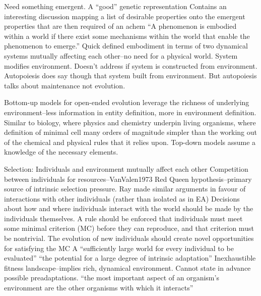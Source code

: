 Need something emergent. \parencite{Nellis2014}
A ``good'' genetic representation \parencite{Soros2014}
Contains an interesting discussion mapping a list of desirable properties onto the emergent properties that are then required of an \gls{achem} \parencite{Faulconbridge2010, Faulconbridge2011}
``A phenomenon is embodied within a world if there exist some mechanisms within the world that enable the phenomenon to emerge.'' \cite{Nellis2014}
Quick defined embodiment in terms of two dynamical systems mutually affecting each other--no need for a physical world. System modifies environment. Doesn't address if system is constructed from environment. Autopoiesis does say though that system built from environment. But autopoiesis talks about maintenance not evolution. \parencite{Nellis2014}

Bottom-up models for open-ended evolution leverage the richness of underlying environment--less information in entity definition, more in environment definition. Similar to biology, where physics and chemistry underpin living organisms, where definition of minimal cell many orders of magnitude simpler than the working out of the chemical and physical rules that it relies upon. Top-down models assume a knowledge of the necessary elements.

Selection:
Individuals and environment mutually affect each other \parencite{Taylor2001}
Competition between individuals for resources--VanValen1973 Red Queen hypothesis--primary source of intrinsic selection pressure. \parencite{Taylor2001}
Ray made similar arguments in favour of interactions with other individuals (rather than isolated as in EA) 
Decisions about how and where individuals interact with the world should be made by the individuals themselves. \parencite{Soros2014}
A rule should be enforced that individuals must meet some minimal criterion (MC) before they can reproduce, and that criterion must be nontrivial.\parencite{Soros2014}
The evolution of new individuals should create novel opportunities for satisfying the MC \parencite{Soros2014}
A ``sufficiently large world for every individual to be evaluated'' \parencite{Soros2014}
``the potential for a large degree of intrinsic adaptation'' \parencite{Taylor2001}
Inexhaustible fitness landscape--implies rich, dynamical environment. \parencite{Vasas2015}
Cannot state in advance possible preadaptations. \parencite{Vasas2015}
``the most important aspect of an organism's environment are the other organisms with which it interacts'' \parencite{Maley1999}

